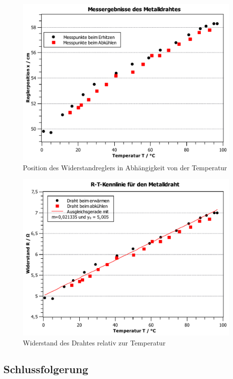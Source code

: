 \documentclass[11pt,a4paper,titlepage, ngerman]{article}
\begin{document}
			\begin{figure}
				\centering
				\includegraphics[width=\textwidth]{MessungDraht.pdf}
				\caption{Position des Widerstandreglers in Abhängigkeit von der Temperatur}
				\label{Ölbad}
			\end{figure}
			\begin{figure}
				\centering
				\includegraphics[width=\textwidth]{KennlinieDrahtRT.pdf}
				\caption{Widerstand des Drahtes relativ zur Temperatur}
				\label{fig:drahtRT}
			\end{figure}
			
		\subsection{Schlussfolgerung}	
			
\end{document}
